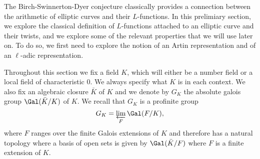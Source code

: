 The Birch-Swinnerton-Dyer conjecture classically provides a connection between the arithmetic of elliptic curves and their $L$-functions. In this prelimiary section, we explore the classical definition of $L$-functions attached to an elliptic curve and their twists, and we explore some of the relevant properties that we will use later on. To do so, we first need to explore the notion of an Artin representation and of an $\ell$-adic representation. 

Throughout this section we fix a field $K$, which will either be a number field or a local field of characteristic $0$. We always specify what $K$ is in each context. We also fix an algebraic closure $\bar{K}$ of $K$ and we denote by $G_K$ the absolute galois group $\Gal(\bar{K}/K)$ of $K$. We recall that $G_K$ is a profinite group
$$G_K=\varprojlim_{F}\Gal(F/K),$$
where $F$ ranges over the finite Galois extensions of $K$ and therefore has a natural topology where a basis of open sets is given by $\Gal(\bar{K}/F)$ where $F$ is a finite extension of $K$.




